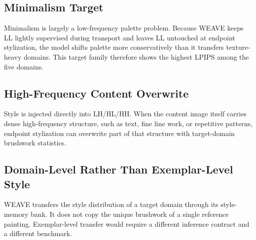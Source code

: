 \documentclass[10pt,letterpaper]{article}
\begin{document}
\subsection{Minimalism Target}
\label{sec:minimalism}

Minimalism is largely a low-frequency palette problem. Because WEAVE keeps LL lightly supervised during transport and leaves LL untouched at endpoint stylization, the model shifts palette more conservatively than it transfers texture-heavy domains. This target family therefore shows the highest LPIPS among the five domains.

\subsection{High-Frequency Content Overwrite}
\label{sec:hf_overwrite}

Style is injected directly into LH/HL/HH. When the content image itself carries dense high-frequency structure, such as text, fine line work, or repetitive patterns, endpoint stylization can overwrite part of that structure with target-domain brushwork statistics.

\subsection{Domain-Level Rather Than Exemplar-Level Style}
\label{sec:domain_level}

WEAVE transfers the style distribution of a target domain through its style-memory bank. It does not copy the unique brushwork of a single reference painting. Exemplar-level transfer would require a different inference contract and a different benchmark.
\end{document}
